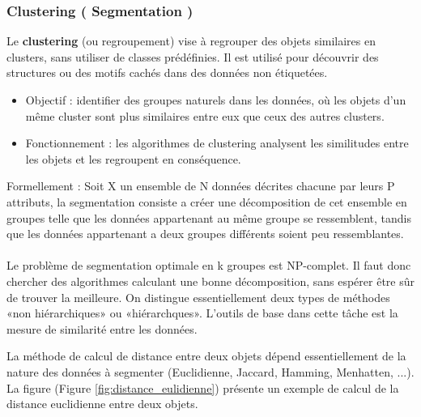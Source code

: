 \documentclass[a4paper,14pt]{article}
\begin{document}
        \subsubsection{Clustering ( Segmentation )}
        
        Le \textbf{clustering} (ou regroupement) vise à regrouper des objets similaires en clusters, sans utiliser de classes prédéfinies. Il est utilisé pour découvrir des structures ou des motifs cachés dans des données non étiquetées.
        
        
        \begin{itemize}
            \item  Objectif : identifier des groupes naturels dans les données, où les objets d’un même cluster sont plus similaires entre eux que ceux des autres clusters.
            \item  Fonctionnement : les algorithmes de clustering analysent les similitudes entre les objets et les regroupent en conséquence.\\
        \end{itemize}
        Formellement : Soit X un ensemble de N données décrites chacune par leurs P
        attributs, la segmentation consiste a créer une décomposition de cet ensemble
        en groupes telle que les données appartenant au même groupe se ressemblent,
        tandis que les données appartenant a deux groupes différents soient peu
        ressemblantes.{\\}{\\}
        Le problème de segmentation optimale en k groupes est NP-complet. Il faut
        donc chercher des algorithmes calculant une bonne décomposition, sans
        espérer être sûr de trouver la meilleure. On distingue essentiellement deux 
        types de méthodes «non hiérarchiques» ou «hiérarchques».
        L’outils de base dans cette tâche est la mesure de similarité entre les données.
        

        La méthode de calcul de distance entre deux objets dépend essentiellement de
        la nature des données à segmenter (Euclidienne, Jaccard, Hamming,
        Menhatten, ...). La figure (Figure \ref{fig:distance_eulidienne}) présente un exemple de calcul de la distance
        euclidienne entre deux objets.
            
\end{document}
